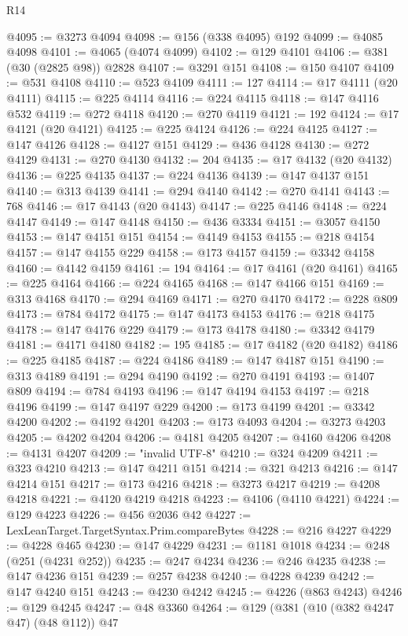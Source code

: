 \begin{lexlean}{R14}
\begin{coremodule}
@4095 := @3273 @4094
@4098 := @156 (@338 @4095) @192
@4099 := @4085 @4098
@4101 := @4065 (@4074 @4099)
@4102 := @129 @4101
@4106 := @381 (@30 (@2825 @98)) @2828
@4107 := @3291 @151
@4108 := @150 @4107
@4109 := @531 @4108
@4110 := @523 @4109
@4111 := 127
@4114 := @17 @4111 (@20 @4111)
@4115 := @225 @4114
@4116 := @224 @4115
@4118 := @147 @4116 @532
@4119 := @272 @4118
@4120 := @270 @4119
@4121 := 192
@4124 := @17 @4121 (@20 @4121)
@4125 := @225 @4124
@4126 := @224 @4125
@4127 := @147 @4126
@4128 := @4127 @151
@4129 := @436 @4128
@4130 := @272 @4129
@4131 := @270 @4130
@4132 := 204
@4135 := @17 @4132 (@20 @4132)
@4136 := @225 @4135
@4137 := @224 @4136
@4139 := @147 @4137 @151
@4140 := @313 @4139
@4141 := @294 @4140
@4142 := @270 @4141
@4143 := 768
@4146 := @17 @4143 (@20 @4143)
@4147 := @225 @4146
@4148 := @224 @4147
@4149 := @147 @4148
@4150 := @436 @3334
@4151 := @3057 @4150
@4153 := @147 @4151 @151
@4154 := @4149 @4153
@4155 := @218 @4154
@4157 := @147 @4155 @229
@4158 := @173 @4157
@4159 := @3342 @4158
@4160 := @4142 @4159
@4161 := 194
@4164 := @17 @4161 (@20 @4161)
@4165 := @225 @4164
@4166 := @224 @4165
@4168 := @147 @4166 @151
@4169 := @313 @4168
@4170 := @294 @4169
@4171 := @270 @4170
@4172 := @228 @809
@4173 := @784 @4172
@4175 := @147 @4173 @4153
@4176 := @218 @4175
@4178 := @147 @4176 @229
@4179 := @173 @4178
@4180 := @3342 @4179
@4181 := @4171 @4180
@4182 := 195
@4185 := @17 @4182 (@20 @4182)
@4186 := @225 @4185
@4187 := @224 @4186
@4189 := @147 @4187 @151
@4190 := @313 @4189
@4191 := @294 @4190
@4192 := @270 @4191
@4193 := @1407 @809
@4194 := @784 @4193
@4196 := @147 @4194 @4153
@4197 := @218 @4196
@4199 := @147 @4197 @229
@4200 := @173 @4199
@4201 := @3342 @4200
@4202 := @4192 @4201
@4203 := @173 @4093
@4204 := @3273 @4203
@4205 := @4202 @4204
@4206 := @4181 @4205
@4207 := @4160 @4206
@4208 := @4131 @4207
@4209 := "invalid UTF-8"
@4210 := @324 @4209
@4211 := @323 @4210
@4213 := @147 @4211 @151
@4214 := @321 @4213
@4216 := @147 @4214 @151
@4217 := @173 @4216
@4218 := @3273 @4217
@4219 := @4208 @4218
@4221 := @4120 @4219 @4218
@4223 := @4106 (@4110 @4221)
@4224 := @129 @4223
@4226 := @456 @2036 @42
@4227 := LexLeanTarget.TargetSyntax.Prim.compareBytes
@4228 := @216 @4227
@4229 := @4228 @465
@4230 := @147 @4229
@4231 := @1181 @1018
@4234 := @248 (@251 (@4231 @252))
@4235 := @247 @4234
@4236 := @246 @4235
@4238 := @147 @4236 @151
@4239 := @257 @4238
@4240 := @4228 @4239
@4242 := @147 @4240 @151
@4243 := @4230 @4242
@4245 := @4226 (@863 @4243)
@4246 := @129 @4245
@4247 := @48 @3360
@4264 := @129
    (@381
      (@10 (@382 @4247 @47) (@48 @112))
      @47

\end{coremodule}
\end{lexlean}
